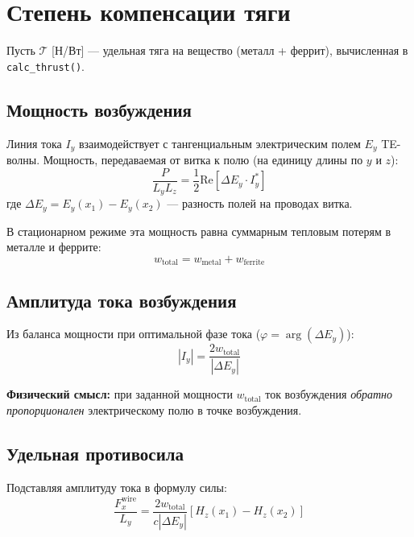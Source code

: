 \documentclass[a4paper,12pt]{article}
\begin{document}
\section{Степень компенсации тяги}

Пусть $\mathcal{T}$ [Н/Вт] --- удельная тяга на вещество (металл + феррит), вычисленная в \texttt{calc\_thrust()}.

\subsection{Мощность возбуждения}

Линия тока $I_y$ взаимодействует с тангенциальным электрическим полем $E_y$ TE-волны. Мощность, передаваемая от витка к полю (на единицу длины по $y$ и $z$):
\begin{equation}
\frac{P}{L_y L_z} = \frac{1}{2} \mathrm{Re} \left[ \Delta E_y \cdot I_y^* \right]
\end{equation}
где $\Delta E_y = E_y(x_1) - E_y(x_2)$ --- разность полей на проводах витка.

В стационарном режиме эта мощность равна суммарным тепловым потерям в металле и феррите:
\begin{equation}
w_{\text{total}} = w_{\text{metal}} + w_{\text{ferrite}}
\end{equation}

\subsection{Амплитуда тока возбуждения}

Из баланса мощности при оптимальной фазе тока ($\varphi = \arg(\Delta E_y)$):
\begin{equation}
\boxed{
|I_y| = \frac{2 w_{\text{total}}}{|\Delta E_y|}
}
\end{equation}

\textbf{Физический смысл:} при заданной мощности $w_{\text{total}}$ ток возбуждения \textit{обратно пропорционален} электрическому полю в точке возбуждения.

\subsection{Удельная противосила}

Подставляя амплитуду тока в формулу силы:
\begin{equation}
\frac{F_x^{\text{wire}}}{L_y} = \frac{2 w_{\text{total}}}{c |\Delta E_y|} \left[ H_z(x_1) - H_z(x_2) \right]
\end{equation}
\end{document}
